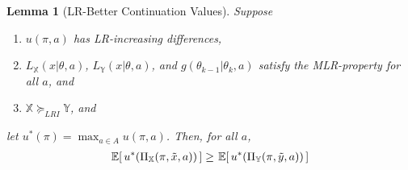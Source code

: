 \documentclass[11pt,onecolumn]{article}
\theoremstyle{plain}
\newtheorem{lemma}{Lemma}[section]
\newcommand{\ev}[1]{\hspace{+0.20ex}\mathbb{E}\hspace{-0.40ex}\left[ \, #1 \, \right]}
\newcommand{\iX}[0]{{\mathbb{X}}}
\newcommand{\iY}[0]{{\mathbb{Y}}}
\begin{document}
\begin{lemma}[LR-Better Continuation Values]\label{lemma:LRI-ContVal} Suppose
\begin{enumerate}
\item $u(\pi,a)$ has LR-increasing differences,
\item $L_\iX(x|\theta,a)$, $L_\iY(x|\theta,a)$, and $g(\theta_{k-1}|\theta_k,a)$ satisfy the MLR-property for all $a$, and
\item $\iX \succeq_{LRI} \iY$, and
\end{enumerate}
let $u^*(\pi)=\max_{a\in A} u(\pi, a)$. Then, for all $a$,
\begin{align}
\ev{u^*(\Pi_\iX(\pi,\tilde{x},a))} \geq \ev{u^*(\Pi_\iY(\pi,\tilde{y},a))} %
\end{align}
\end{lemma}
\end{document}
